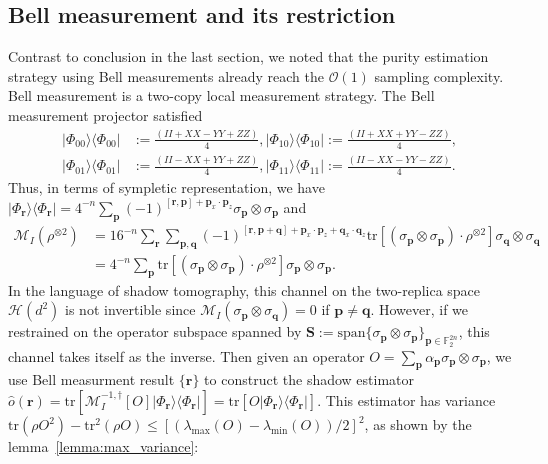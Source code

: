 \documentclass[aps,%
twocolumn,%
floatfix,%
pra,%
amsfonts,%
groupedaddress,%
superscriptaddress]{revtex4-2}%
\newcommand{\bra}[1]{\langle #1\rvert}
\newcommand{\ket}[1]{\lvert #1\rangle}
\newcommand{\1}{\mathbbm{1}}
\begin{document}
\subsection{Bell measurement and its restriction}\label{app:Bell_shadow}
Contrast to conclusion in the last section, we noted that the purity estimation strategy using Bell measurements already reach the $\mathcal{O}(1)$ sampling complexity.
Bell measurement is a two-copy local measurement strategy.
 The Bell measurement projector satisfied
\begin{align}
    \ket{\Phi_{00}}\!\bra{\Phi_{00}}&:= \frac{(II + XX - YY + ZZ)}{4},\ket{\Phi_{10}}\!\bra{\Phi_{10}}:= \frac{(II + XX + YY - ZZ)}{4},\\
    \ket{\Phi_{01}}\!\bra{\Phi_{01}}&:= \frac{(II - XX + YY + ZZ)}{4},\ket{\Phi_{11}}\!\bra{\Phi_{11}}:= \frac{(II - XX - YY - ZZ)}{4}.
\end{align}
Thus, in terms of sympletic representation, we have $\ket{\Phi_{\mathbf{r}}}\!\bra{\Phi_{\mathbf{r}}} = 4^{-n}\sum_{\mathbf{p}} (-1)^{[\mathbf{r}, \mathbf{p}] + \mathbf{p}_x\cdot \mathbf{p}_z}\sigma_{\mathbf{p}} \otimes \sigma_{\mathbf{p}} $ and
\begin{align}
\label{eq:Bell_deco}
    \mathcal{M}_{I}(\rho^{\otimes 2}) &= 16^{-n}\sum_{\mathbf{r}}  \sum_{\mathbf{p},\mathbf{q}} (-1)^{[\mathbf{r}, \mathbf{p} + \mathbf{q}] + \mathbf{p}_x\cdot \mathbf{p}_z +  \mathbf{q}_x\cdot \mathbf{q}_z}\mathrm{tr}\left[(\sigma_{\mathbf{p}} \otimes \sigma_{\mathbf{p}})\cdot\rho^{\otimes 2}\right] \sigma_{\mathbf{q}} \otimes \sigma_{\mathbf{q}}\\
    &= 4^{-n}\sum_{\mathbf{p}}\mathrm{tr}\left[(\sigma_{\mathbf{p}} \otimes \sigma_{\mathbf{p}})\cdot\rho^{\otimes 2}\right]\sigma_{\mathbf{p}} \otimes \sigma_{\mathbf{p}}.
\end{align}
In the language of shadow tomography, this channel on the two-replica space $\mathcal{H}(d^2)$ is not invertible since $\mathcal{M}_{I}(\sigma_{\mathbf{p}} \otimes \sigma_{\mathbf{q}}) = 0$ if $\mathbf{p} \neq \mathbf{q}$. 
However, if we restrained on the operator subspace spanned by $\mathbf{S}:=\mathrm{span}\{\sigma_{\mathbf{p} }\otimes \sigma_{\mathbf{p}}\}_{\mathbf{p} \in \mathbb{F}_2^{2n}}$, this channel takes itself as the inverse.
Then given an operator $O = \sum_{\mathbf{p}} \alpha_{\mathbf{p}} \sigma_{\mathbf{p}} \otimes \sigma_{\mathbf{p}}$, we use Bell measurment result $\{\mathbf{r}\}$ to construct the shadow estimator $\hat{o}(\mathbf{r}) = \mathrm{tr}\left[\mathcal{M}_{I}^{-1,\dagger}[O] \ket{\Phi_{\mathbf{r}}}\!\bra{{\Phi_{\mathbf{r}}}}\right]= \mathrm{tr}\left[O \ket{\Phi_{\mathbf{r}}}\!\bra{{\Phi_{\mathbf{r}}}}\right]$. This estimator has variance $\mathrm{tr}(\rho O^2) - \mathrm{tr}^2(\rho O) \leq \left[(\lambda_{\max}(O) - \lambda_{\min}(O))/2\right]^2$, as shown by the lemma~\ref{lemma:max_variance}:
\end{document}
